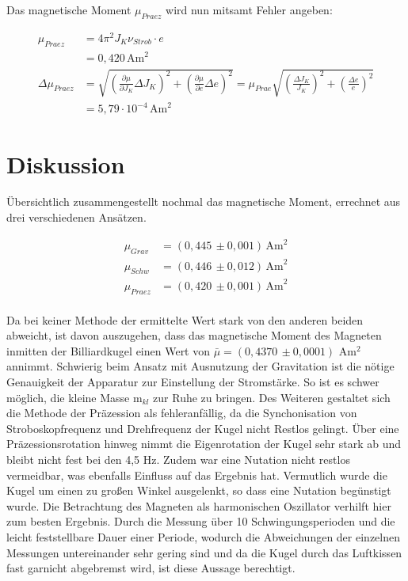 Das magnetische Moment $\mu_{Praez}$ wird nun mitsamt Fehler angeben:

\begin{align}
 \nonumber
 \mu_{Praez} &= 4\pi^2 J_K \nu_{Strob} \cdot e \\
 &= 0,420\, \text{Am}^2\\
 \nonumber
 \Delta \mu_{Praez} &= \sqrt{\left(\frac{\partial \mu}{\partial J_{K}}\Delta J_{K} \right)^2 + \left(\frac{\partial \mu}{\partial e}\Delta e \right)^2} = \mu_{Prae} \sqrt{\left( \frac{\Delta J_{K}}{J_{K}}\right)^2 + \left( \frac{\Delta e}{e}\right)^2}\\
 &= 5,79 \cdot 10^{-4}\, \text{Am}^2
\end{align}

\section{Diskussion}
Übersichtlich zusammengestellt nochmal das magnetische Moment, errechnet aus drei verschiedenen Ansätzen.

\begin{align*}
 \mu_{Grav} &= (0,445 \, \pm 0,001)\, \text{Am}^2\\
 \mu_{Schw} &= (0,446 \, \pm 0,012)\, \text{Am}^2\\
 \mu_{Praez} &= (0,420\, \pm 0,001)\, \text{Am}^2\\
\end{align*}

Da bei keiner Methode der ermittelte Wert stark von den anderen beiden abweicht, ist davon auszugehen, dass das magnetische
Moment des Magneten inmitten der Billiardkugel einen Wert von $\bar \mu = (0,4370 \, \pm 0,0001)$ Am$^2$ annimmt. Schwierig beim Ansatz mit Ausnutzung der
Gravitation ist die nötige Genauigkeit der Apparatur zur Einstellung der Stromstärke. So ist es schwer möglich, die kleine Masse m$_{kl}$
zur Ruhe zu bringen. Des Weiteren gestaltet sich die Methode der Präzession als fehleranfällig, da die Synchonisation von Stroboskopfrequenz
und Drehfrequenz der Kugel nicht Restlos gelingt. Über eine Präzessionsrotation hinweg nimmt die Eigenrotation der Kugel sehr stark ab und bleibt nicht fest bei den 4,5 Hz. Zudem war eine Nutation nicht restlos vermeidbar, was ebenfalls Einfluss auf das Ergebnis hat. 
Vermutlich wurde die Kugel um einen zu großen Winkel ausgelenkt, so dass eine Nutation begünstigt wurde. Die Betrachtung des Magneten als
harmonischen Oszillator verhilft hier zum besten Ergebnis. Durch die Messung über 10 Schwingungsperioden und die leicht feststellbare Dauer
einer Periode, wodurch die Abweichungen der einzelnen Messungen untereinander sehr gering sind und da die Kugel durch das Luftkissen fast garnicht abgebremst wird,
 ist diese Aussage berechtigt.






